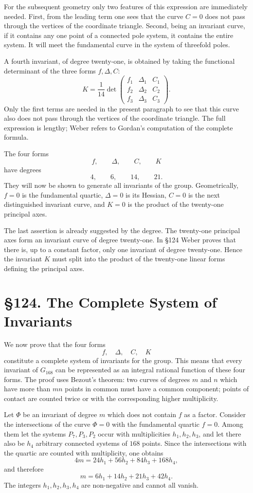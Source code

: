 \documentclass[11pt,a4paper]{book}
\newcommand{\webersection}[2]{\clearpage\section*{\S #1. #2}}
\begin{document}
For the subsequent geometry only two features of this expression are immediately needed.  First, from the leading term one sees that the curve \(C=0\) does not pass through the vertices of the coordinate triangle.  Second, being an invariant curve, if it contains any one point of a connected pole system, it contains the entire system.  It will meet the fundamental curve in the system of threefold poles.

A fourth invariant, of degree twenty-one, is obtained by taking the functional determinant of the three forms \(f,\Delta,C\):
\[
 K=\frac{1}{14}
 \det
 \begin{pmatrix}
 f_1&\Delta_1&C_1\\
 f_2&\Delta_2&C_2\\
 f_3&\Delta_3&C_3
 \end{pmatrix}.
\]
Only the first terms are needed in the present paragraph to see that this curve also does not pass through the vertices of the coordinate triangle.  The full expression is lengthy; Weber refers to Gordan's computation of the complete formula.

The four forms
\[
 f,
\qquad \Delta,
\qquad C,
\qquad K
\]
have degrees
\[
4,
\qquad 6,
\qquad 14,
\qquad 21.
\]
They will now be shown to generate all invariants of the group.  Geometrically, \(f=0\) is the fundamental quartic, \(\Delta=0\) is its Hessian, \(C=0\) is the next distinguished invariant curve, and \(K=0\) is the product of the twenty-one principal axes.

The last assertion is already suggested by the degree.  The twenty-one principal axes form an invariant curve of degree twenty-one.  In \S 124 Weber proves that there is, up to a constant factor, only one invariant of degree twenty-one.  Hence the invariant \(K\) must split into the product of the twenty-one linear forms defining the principal axes.

\webersection{124}{The Complete System of Invariants}

We now prove that the four forms
\[
 f,
\quad \Delta,
\quad C,
\quad K
\]
constitute a complete system of invariants for the group.  This means that every invariant of \(G_{168}\) can be represented as an integral rational function of these four forms.  The proof uses Bezout's theorem: two curves of degrees \(m\) and \(n\) which have more than \(mn\) points in common must have a common component; points of contact are counted twice or with the corresponding higher multiplicity.

Let \(\Phi\) be an invariant of degree \(m\) which does not contain \(f\) as a factor.  Consider the intersections of the curve \(\Phi=0\) with the fundamental quartic \(f=0\).  Among them let the systems \(P_7,P_3,P_2\) occur with multiplicities \(h_1,h_2,h_3\), and let there also be \(h_4\) arbitrary connected systems of \(168\) points.  Since the intersections with the quartic are counted with multiplicity, one obtains
\[
4m=24h_1+56h_2+84h_3+168h_4,
\]
and therefore
\[
 m=6h_1+14h_2+21h_3+42h_4. \tag{1}
\]
The integers \(h_1,h_2,h_3,h_4\) are non-negative and cannot all vanish.
\end{document}
